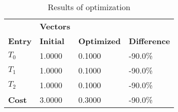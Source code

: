 \begin{table}[h!]
\centering
\begin{tabular}{llll}
\textbf{}      & \cellcolor[HTML]{EFEFEF}\textbf{Vectors} & \textbf{} & \textbf{}         \\
\rowcolor[HTML]{EFEFEF} 
\textbf{Entry} & \textbf{Initial} & \textbf{Optimized} & \textbf{Difference} \\
$T_0$ & 1.0000 & 0.1000 & -90.0\% \\ 
$T_1$ & 1.0000 & 0.1000 & -90.0\% \\ 
$T_2$ & 1.0000 & 0.1000 & -90.0\% \\ 
\rowcolor[HTML]{EFEFEF} 
\textbf{Cost}  & 3.0000 & 0.3000 & -90.0\% \\ 
\end{tabular}
\caption{Results of optimization}
\label{tab:OptimizationAnalysis}
\end{table}